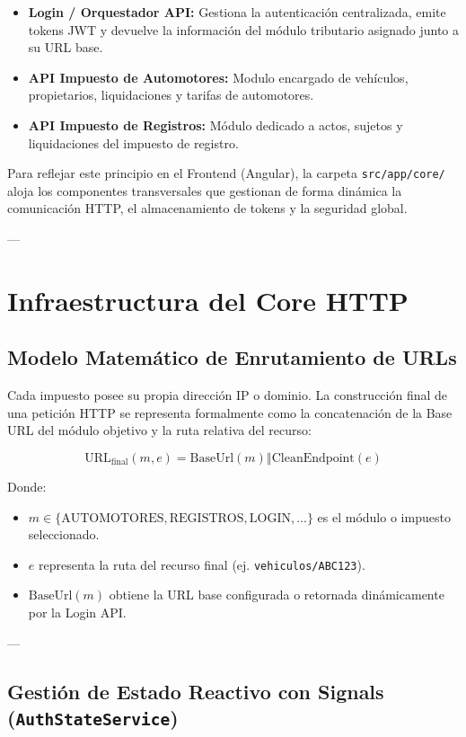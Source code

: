 \documentclass[12pt,a4paper]{article}
\begin{document}
\begin{itemize}
    \item \textbf{Login / Orquestador API:} Gestiona la autenticación centralizada, emite tokens JWT y devuelve la información del módulo tributario asignado junto a su URL base.
    \item \textbf{API Impuesto de Automotores:} Modulo encargado de vehículos, propietarios, liquidaciones y tarifas de automotores.
    \item \textbf{API Impuesto de Registros:} Módulo dedicado a actos, sujetos y liquidaciones del impuesto de registro.
\end{itemize}

Para reflejar este principio en el Frontend (Angular), la carpeta \texttt{src/app/core/} aloja los componentes transversales que gestionan de forma dinámica la comunicación HTTP, el almacenamiento de tokens y la seguridad global.

---

\section{Infraestructura del Core HTTP}

\subsection{Modelo Matemático de Enrutamiento de URLs}

Cada impuesto posee su propia dirección IP o dominio. La construcción final de una petición HTTP se representa formalmente como la concatenación de la Base URL del módulo objetivo y la ruta relativa del recurso:

\[
\text{URL}_{\text{final}}(m, e) = \text{BaseUrl}(m) \mathbin{\Vert} \text{CleanEndpoint}(e)
\]

Donde:
\begin{itemize}
    \item $m \in \{\text{AUTOMOTORES}, \text{REGISTROS}, \text{LOGIN}, \dots\}$ es el módulo o impuesto seleccionado.
    \item $e$ representa la ruta del recurso final (ej. \texttt{vehiculos/ABC123}).
    \item $\text{BaseUrl}(m)$ obtiene la URL base configurada o retornada dinámicamente por la Login API.
\end{itemize}

---

\subsection{Gestión de Estado Reactivo con Signals (\texttt{AuthStateService})}
\end{document}
